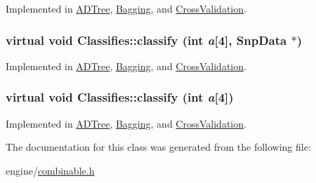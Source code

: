 Implemented in \hyperlink{classADTree_a266a816ec8750b5ceb1549ff610fb67b}{ADTree}, \hyperlink{classBagging_a92072d6610e9b9d932d10a123cc6ff18}{Bagging}, and \hyperlink{classCrossValidation_a4c11570314fe9e98e434abee990ac2d4}{CrossValidation}.

\hypertarget{classClassifies_a7d2ae89f04af1a74eb6dd35be8eda476}{
\subsubsection[{classify}]{\setlength{\rightskip}{0pt plus 5cm}virtual void Classifies::classify (int {\em a}\mbox{[}4\mbox{]}, \/  {\bf SnpData} $\ast$)}}
\label{classClassifies_a7d2ae89f04af1a74eb6dd35be8eda476}


Implemented in \hyperlink{classADTree_a498b7a7830dba60118e89d5f5bb7cbd3}{ADTree}, \hyperlink{classBagging_a9b17e15983996f8ae3b39564e7c3deba}{Bagging}, and \hyperlink{classCrossValidation_a237cd67d2e1e6fc7c62abf0fef8bd3e8}{CrossValidation}.

\hypertarget{classClassifies_a15864d3a95edfde2bf48384c9b25c6d8}{
\subsubsection[{classify}]{\setlength{\rightskip}{0pt plus 5cm}virtual void Classifies::classify (int {\em a}\mbox{[}4\mbox{]})}}
\label{classClassifies_a15864d3a95edfde2bf48384c9b25c6d8}


Implemented in \hyperlink{classADTree_a335cdf83f845638ae6c74fa1d7e7e4b8}{ADTree}, \hyperlink{classBagging_a02227120bc610a21f39f2454ac03ec7b}{Bagging}, and \hyperlink{classCrossValidation_a6b26e9c496dac46fb066fae0f381fed0}{CrossValidation}.



The documentation for this class was generated from the following file:\begin{DoxyCompactItemize}
\item 
engine/\hyperlink{combinable_8h}{combinable.h}\end{DoxyCompactItemize}
